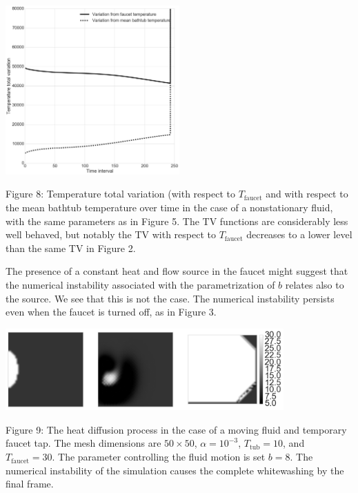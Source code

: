 \documentclass[12pt]{amsart}
\begin{document}
\begin{center}
    \includegraphics[width=0.5\textwidth]{../plots/tv-04.png}

    \justify
    \footnotesize{
    Figure 8: Temperature total variation (with respect to $T_{\mathrm{faucet}}$
    and with respect to the mean bathtub temperature over time in the case of a
    nonstationary fluid, with the same parameters as in Figure 5. The TV
    functions are considerably less well behaved, but notably the TV with
    respect to $T_{\mathrm{faucet}}$ decreases to a lower level than the same TV
in Figure 2.}
\end{center}

The presence of a constant heat and flow source in the faucet might suggest that
the numerical instability associated with the parametrization of $b$ relates
also to the source. We see that this is not the case. The numerical instability
persists even when the faucet is turned off, as in Figure 3.

\begin{center}
    \includegraphics[width=0.8\textwidth]{../plots/diffusion-05.png}

    \justify
    \footnotesize{Figure 9: The heat diffusion process in the case of a moving fluid and
    temporary faucet tap. The mesh dimensions are $50 \times 50$, $\alpha =
    10^{-3}$, $T_{\mathrm{tub}} = 10$, and $T_{\mathrm{faucet}} = 30$. The
    parameter controlling the fluid motion is set $b = 8$. The numerical
    instability of the simulation causes the complete whitewashing by the final
frame.}
\end{center}
\end{document}
